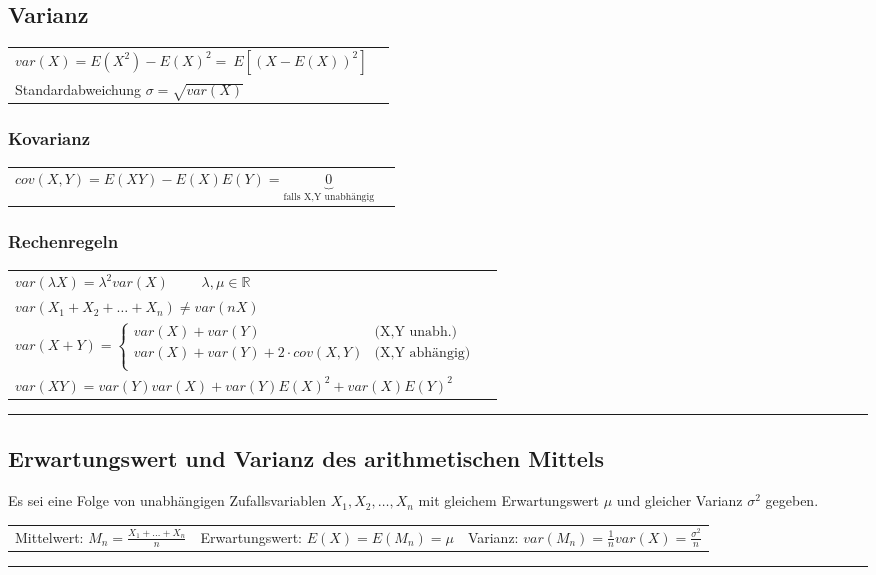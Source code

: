\begin{minipage}{9cm}
\subsection{Varianz }
  \begin{tabular}{ll}
    $\boxed{var(X)=E(X^2)-E(X)^2}= \:E[(X-E(X))^2]$\\
   Standardabweichung $\sigma = \sqrt{var(X)}$
	\end{tabular}
	\subsubsection{Kovarianz}
	\begin{tabular}{ll}
	  $cov(X,Y)=E(XY)-E(X)E(Y)=\underbrace{0}_{\text{falls X,Y unabhängig}}$
	\end{tabular}
\end{minipage}
\begin{minipage}{9cm}
  \subsubsection{Rechenregeln}
  \begin{tabular}{ll}
    $var(\lambda X)=\lambda^2 var(X) \qquad $ $\lambda, \mu
    \in \mathbb{R}$\\
    $var(X_1+X_2+\ldots+X_n) \neq var(n X)$ \\
    $var(X+Y)= \begin{cases}
      var(X)+var(Y)                      &	\text{(X,Y unabh.)}\\                     
      var(X) + var(Y) + 2 \cdot cov(X,Y) &	\text{(X,Y abhängig)}\\
    \end{cases} $ \\
    $var(X Y)= var(Y)var(X)+var(Y)E(X)^2+var(X)E(Y)^2$ \\
  \end{tabular}
\end{minipage}

\hrule

\subsection{Erwartungswert und Varianz des arithmetischen Mittels }
Es sei eine Folge von unabhängigen Zufallsvariablen $X_1, X_2, \ldots , X_n$ mit
gleichem Erwartungswert $ \mu $ und gleicher Varianz $ \sigma^2 $ gegeben. \\
\begin{tabular}{p{6cm} p{6cm} p{6cm}}
  Mittelwert: $M_n=\frac{X_1+\ldots+X_n}{n}$ &
  Erwartungswert: $E(X)=E(M_n) = \mu$  &
  Varianz: $var(M_n)=\frac{1}{n}var(X) = \frac{\sigma ^2}{n} $
\end{tabular}
\vspace{1mm}
\hrule

